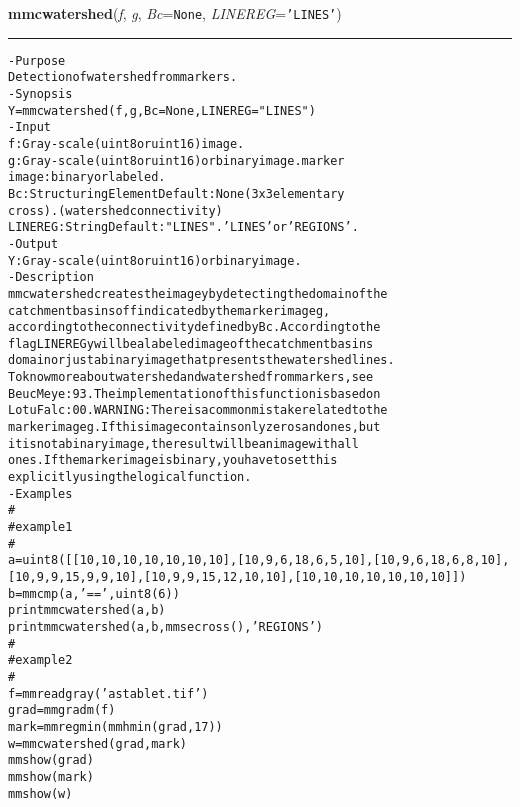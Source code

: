     \begin{boxedminipage}{\textwidth}

    \raggedright \textbf{mmcwatershed}(\textit{f}, \textit{g}, \textit{Bc}=\texttt{N\-o\-n\-e\-}, \textit{LINEREG}=\texttt{'\-L\-I\-N\-E\-S\-'\-})

    \vspace{-1.5ex}

    \rule{\textwidth}{0.5\fboxrule}
\begin{alltt}
- Purpose
    Detection of watershed from markers.
- Synopsis
    Y = mmcwatershed(f, g, Bc=None, LINEREG="LINES")
- Input
    f:       Gray-scale (uint8 or uint16) image.
    g:       Gray-scale (uint8 or uint16) or binary image. marker
             image: binary or labeled.
    Bc:      Structuring Element Default: None (3x3 elementary
             cross). (watershed connectivity)
    LINEREG: String Default: "LINES". 'LINES' or ' REGIONS'.
- Output
    Y: Gray-scale (uint8 or uint16) or binary image.
- Description
    mmcwatershed creates the image y by detecting the domain of the
    catchment basins of f indicated by the marker image g ,
    according to the connectivity defined by Bc . According to the
    flag LINEREG y will be a labeled image of the catchment basins
    domain or just a binary image that presents the watershed lines.
    To know more about watershed and watershed from markers, see
    BeucMeye:93 . The implementation of this function is based on
    LotuFalc:00 . WARNING: There is a common mistake related to the
    marker image g . If this image contains only zeros and ones, but
    it is not a binary image, the result will be an image with all
    ones. If the marker image is binary, you have to set this
    explicitly using the logical function.
- Examples
    \#
    \#   example 1
    \#
    a = uint8([                [10,   10,   10,   10,   10,   10,   10],                [10,    9,    6,   18,    6,    5,   10],                [10,    9,    6,   18,    6,    8,   10],                [10,    9,    9,   15,    9,    9,   10],                [10,    9,    9,   15,   12,   10,   10],                [10,   10,   10,   10,   10,   10,   10]])
    b = mmcmp(a,'==',uint8(6))
    print mmcwatershed(a,b)
    print mmcwatershed(a,b,mmsecross(),'REGIONS')
    \#
    \#   example 2
    \#
    f=mmreadgray('astablet.tif')
    grad=mmgradm(f)
    mark=mmregmin(mmhmin(grad,17))
    w=mmcwatershed(grad,mark)
    mmshow(grad)
    mmshow(mark)
    mmshow(w)\end{alltt}

    \vspace{1ex}

    \end{boxedminipage}

